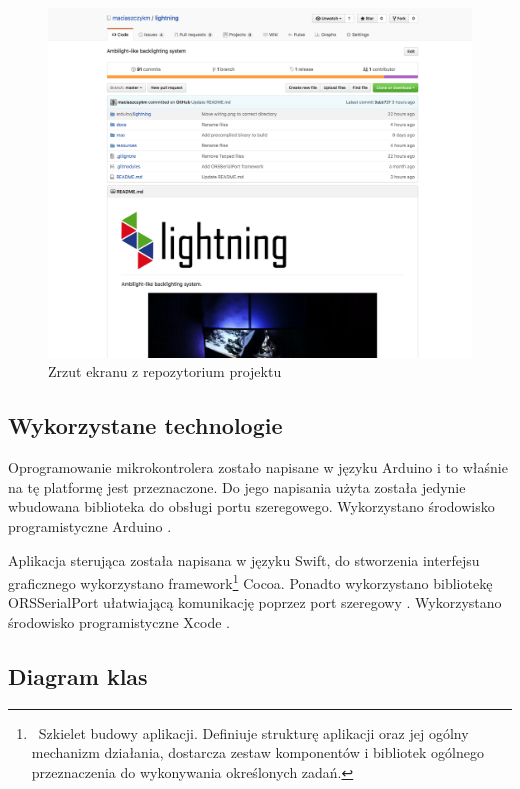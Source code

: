 \documentclass[12pt]{report}
\begin{document}
\begin{figure}[h]
\centering
\includegraphics[width=\textwidth]{../resources/github.png}
\caption{Zrzut ekranu z repozytorium projektu}
\label{schemat}
\end{figure}

\subsection{Wykorzystane technologie}

Oprogramowanie mikrokontrolera zostało napisane w języku Arduino i to właśnie na tę platformę jest przeznaczone. Do jego napisania użyta została jedynie wbudowana biblioteka do obsługi portu szeregowego. Wykorzystano środowisko programistyczne Arduino \cite{arduinoide}.

Aplikacja sterująca została napisana w języku Swift, do stworzenia interfejsu graficznego wykorzystano framework\footnote{~Szkielet budowy aplikacji. Definiuje strukturę aplikacji oraz jej ogólny mechanizm działania, dostarcza zestaw komponentów i bibliotek ogólnego przeznaczenia do wykonywania określonych zadań.} Cocoa. Ponadto wykorzystano bibliotekę\\ORSSerialPort ułatwiającą komunikację poprzez port szeregowy \cite{orsserialport}. Wykorzystano środowisko programistyczne Xcode \cite{xcode}.

\subsection{Diagram klas}
\end{document}
